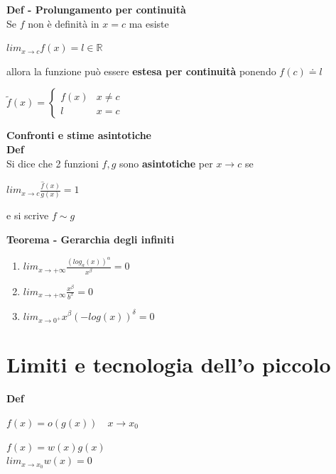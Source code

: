 \documentclass[12pt, a4paper]{article}
\begin{document}
    \textbf{Def - Prolungamento per continuità}\\Se $f$ non è definità in $x=c$ ma esiste
    \begin{center}
        $lim_{x\to c}f(x)=l\in\mathbb{R}$
    \end{center}
    allora la funzione può essere \textbf{estesa per continuità} ponendo $f(c)\doteq l$
    \begin{center}
        $\tilde{f}(x)=
            \begin{cases}
                f(x) & x\neq c \\
                l    & x=c
            \end{cases}$
    \end{center}

    \textbf{Confronti e stime asintotiche\\Def}\\Si dice che 2 funzioni $f,g$ sono \textbf{asintotiche} per $x\to c$ se
    \begin{center}
        $lim_{x\to c}\frac{\hat{f}(x)}{g(x)}=1$
    \end{center}
    e si scrive $f\sim g$

    \textbf{Teorema - Gerarchia degli infiniti}\\
    \begin{enumerate}
        \item $lim_{x\to+\infty}\frac{(log_{a}(x))^{\alpha}}{x^{\beta}}=0$
        \item $lim_{x\to+\infty}\frac{x^{\beta}}{b^{x}}=0$
        \item $lim_{x\to 0^{+}}x^{\beta}(-log(x))^{\delta}=0$
    \end{enumerate}

    \section{Limiti e tecnologia dell'o piccolo}
    \textbf{Def}\\
    \begin{center}
        $f(x)=o(g(x))\quad x\to x_{0}$
    \end{center}
    \begin{center}
        $f(x)=w(x)g(x)$\\
        $lim_{x\to x_{0}}w(x)=0$
    \end{center}
\end{document}
